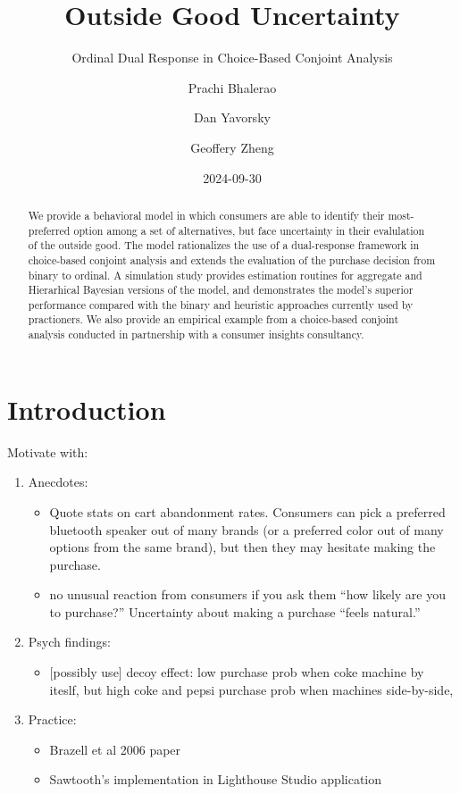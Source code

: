 \documentclass[
  letterpaper,
  DIV=11,
  numbers=noendperiod]{scrartcl}
\title{Outside Good Uncertainty}
\subtitle{Ordinal Dual Response in Choice-Based Conjoint Analysis}
\author{Prachi Bhalerao \and Dan Yavorsky \and Geoffery Zheng}
\date{2024-09-30}
\providecommand{\tightlist}{%
  \setlength{\itemsep}{0pt}\setlength{\parskip}{0pt}}\usepackage{longtable,booktabs,array}
\begin{document}
\maketitle
\begin{abstract}
We provide a behavioral model in which consumers are able to identify
their most-preferred option among a set of alternatives, but face
uncertainty in their evalulation of the outside good. The model
rationalizes the use of a dual-response framework in choice-based
conjoint analysis and extends the evaluation of the purchase decision
from binary to ordinal. A simulation study provides estimation routines
for aggregate and Hierarhical Bayesian versions of the model, and
demonstrates the model's superior performance compared with the binary
and heuristic approaches currently used by practioners. We also provide
an empirical example from a choice-based conjoint analysis conducted in
partnership with a consumer insights consultancy.
\end{abstract}


  \newcommand{\x}{\mathbf{x}}
  \newcommand{\bfbeta}{\boldsymbol{\beta}}
  \newcommand{\iid}{\stackrel{iid}{\sim}}

\section{Introduction}\label{sec-intro}

Motivate with:

\begin{enumerate}
\def\labelenumi{\arabic{enumi}.}
\item
  Anecdotes:

  \begin{itemize}
  \tightlist
  \item
    Quote stats on cart abandonment rates. Consumers can pick a
    preferred bluetooth speaker out of many brands (or a preferred color
    out of many options from the same brand), but then they may hesitate
    making the purchase.
  \item
    no unusual reaction from consumers if you ask them ``how likely are
    you to purchase?'' Uncertainty about making a purchase ``feels
    natural.''
  \end{itemize}
\item
  Psych findings:

  \begin{itemize}
  \tightlist
  \item
    {[}possibly use{]} decoy effect: low purchase prob when coke machine
    by iteslf, but high coke and pepsi purchase prob when machines
    side-by-side,
  \end{itemize}
\item
  Practice:

  \begin{itemize}
  \tightlist
  \item
    Brazell et al 2006 paper
  \item
    Sawtooth's implementation in Lighthouse Studio application
  \end{itemize}
\end{enumerate}
\end{document}
